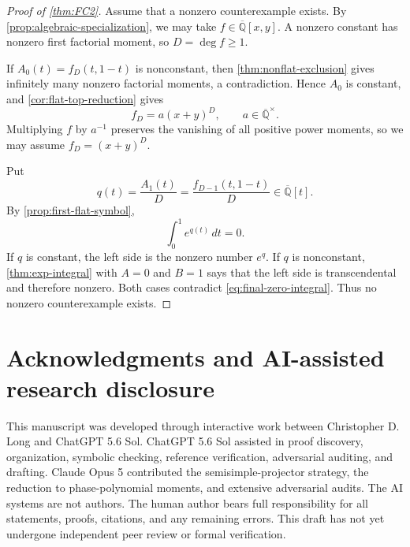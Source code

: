 \documentclass[11pt]{article}
\numberwithin{equation}{section}
\theoremstyle{definition}
\theoremstyle{remark}
\newcommand{\Qbar}{\overline{\mathbb Q}}
\begin{document}
\begin{proof}[Proof of \cref{thm:FC2}]
Assume that a nonzero counterexample exists.  By
\cref{prop:algebraic-specialization}, we may take
$f\in\Qbar[x,y]$.  A nonzero constant has nonzero first factorial moment,
so $D=\deg f\ge1$.

If $A_0(t)=f_D(t,1-t)$ is nonconstant, then
\cref{thm:nonflat-exclusion} gives infinitely many nonzero factorial
moments, a contradiction.  Hence $A_0$ is constant, and
\cref{cor:flat-top-reduction} gives
\[
  f_D=a(x+y)^D,
  \qquad a\in\Qbar^\times.
\]
Multiplying $f$ by $a^{-1}$ preserves the vanishing of all positive power
moments, so we may assume $f_D=(x+y)^D$.

Put
\[
  q(t)=\frac{A_1(t)}D
  =\frac{f_{D-1}(t,1-t)}D\in\Qbar[t].
\]
By \cref{prop:first-flat-symbol},
\begin{equation}\label{eq:final-zero-integral}
  \int_0^1 e^{q(t)}\,dt=0.
\end{equation}
If $q$ is constant, the left side is the nonzero number $e^q$.  If $q$ is
nonconstant, \cref{thm:exp-integral} with $A=0$ and $B=1$ says that the
left side is transcendental and therefore nonzero.  Both cases contradict
\eqref{eq:final-zero-integral}.  Thus no nonzero counterexample exists.
\end{proof}

\section*{Acknowledgments and AI-assisted research disclosure}

This manuscript was developed through interactive work between Christopher
D. Long and ChatGPT 5.6 Sol.  ChatGPT 5.6 Sol assisted in proof discovery,
organization, symbolic checking, reference verification, adversarial
auditing, and drafting.  Claude Opus 5 contributed the semisimple-projector
strategy, the reduction to phase-polynomial moments, and extensive
adversarial audits.  The AI systems are not authors.  The human author bears
full responsibility for all statements, proofs, citations, and any remaining
errors.  This draft has not yet undergone independent peer review or formal
verification.
\end{document}
